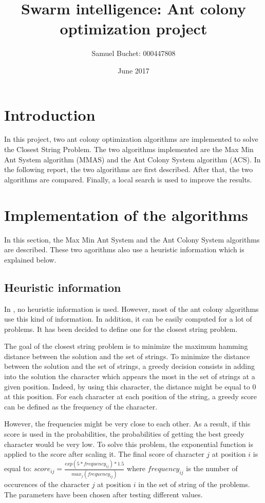 \documentclass{article}
\title{Swarm intelligence: Ant colony optimization project}
\author{Samuel Buchet: 000447808}
\date{June 2017}
\begin{document}
\maketitle

\section*{Introduction}

In this project, two ant colony optimization algorithms are implemented to solve the Closest String Problem.
The two algorithms implemented are the Max Min Ant System algorithm (MMAS) and the Ant Colony System algorithm (ACS).
In the following report, the two algorithms are first described.
After that, the two algorithms are compared.
Finally, a local search is used to improve the results.

\section{Implementation of the algorithms}

In this section, the Max Min Ant System and the Ant Colony System algorithms are described.
These two agorithms also use a heuristic information which is explained below.

\subsection{Heuristic information}

In \cite{aco_csp}, no heuristic information is used.
However, most of the ant colony algorithms use this kind of information.
In addition, it can be easily computed for a lot of problems.
It has been decided to define one for the closest string problem. \newline

The goal of the closest string problem is to minimize the maximum hamming distance between the solution and the set of strings.
To minimize the distance between the solution and the set of strings, a greedy decision consists in adding into the solution the character which appears the most in the set of strings at a given position.
Indeed, by using this character, the distance might be equal to 0 at this position.
For each character at each position of the string, a greedy score can be defined as the frequency of the character.\newline

However, the frequencies might be very close to each other.
As a result, if this score is used in the probabilities, the probabilities of getting the best greedy character would be very low.
To solve this problem, the exponential function is applied to the score after scaling it.
The final score of character $j$ at position $i$ is equal to: $score_{ij} = \frac{exp(5*frequency_{ij})*1.5}{max_j(frequency_{ij})}$ where $frequency_{ij}$ is the number of occurences of the character $j$ at position $i$ in the set of string of the problems.
The parameters have been chosen after testing different values.
\end{document}
